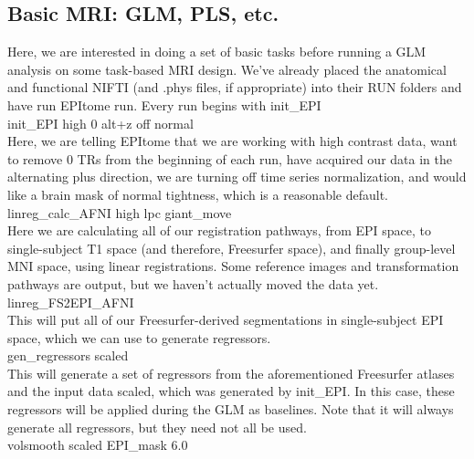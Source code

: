 \documentclass[final,titlepage,letterpaper,oneside,12pt]{article}
\renewcommand{\texttt}[2][BrickRed]{\textcolor{#1}{\ttfamily #2}}%
\begin{document}
\subsection{Basic MRI: GLM, PLS, etc.}

Here, we are interested in doing a set of basic tasks before running a GLM analysis on some task-based MRI design. We've already placed the anatomical and functional NIFTI (and .phys files, if appropriate) into their RUN folders and have run \texttt{EPItome run}. Every run begins with \texttt{init\_EPI} \\

\noindent
\texttt{init\_EPI high 0 alt+z off normal} \\

Here, we are telling EPItome that we are working with high contrast data, want to remove 0 TRs from the beginning of each run, have acquired our data in the alternating plus direction, we are turning off time series normalization, and would like a brain mask of normal tightness, which is a reasonable default. \\

\noindent
\texttt{linreg\_calc\_AFNI high lpc giant\_move} \\

Here we are calculating all of our registration pathways, from EPI space, to single-subject T1 space (and therefore, Freesurfer space), and finally group-level MNI space, using linear registrations. Some reference images and transformation pathways are output, but we haven't actually moved the data yet. \\

\noindent
\texttt{linreg\_FS2EPI\_AFNI} \\

This will put all of our Freesurfer-derived segmentations in single-subject EPI space, which we can use to generate regressors. \\

\noindent
\texttt{gen\_regressors scaled} \\

This will generate a set of regressors from the aforementioned Freesurfer atlases and the input data \texttt{scaled}, which was generated by \texttt{init\_EPI}. In this case, these regressors will be applied during the GLM as baselines. Note that it will always generate all regressors, but they need not all be used. \\

\noindent
\texttt{volsmooth scaled EPI\_mask 6.0} \\
\end{document}
